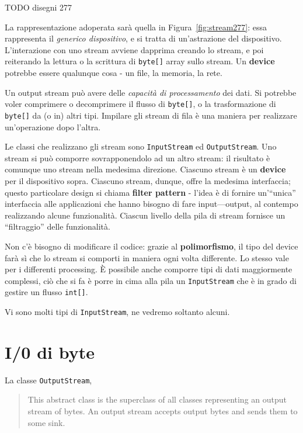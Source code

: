 \documentclass[\fontsizeclass,twocolumn]{\classname}
\theoremstyle{definition}
\theoremstyle{definition}
\begin{document}
TODO disegni 277

La rappresentazione adoperata sarà quella in Figura~\ref{fig:stream277}: essa
rappresenta il \emph{generico dispositivo}, e si tratta di un'astrazione del
dispositivo. L'interazione con uno stream avviene dapprima creando lo stream, e
poi reiterando la lettura o la scrittura di \texttt{byte[]} array sullo stream.
Un \textbf{device} potrebbe essere qualunque cosa \-- un file, la memoria, la
rete. 

Un output stream può avere delle \emph{capacità di processamento} dei dati. Si
potrebbe voler comprimere o decomprimere il flusso di \texttt{byte[]}, o la
trasformazione di \texttt{byte[]} da (o in) altri tipi. Impilare gli stream di
fila è una maniera per realizzare un'operazione dopo l'altra.

Le classi che realizzano gli stream sono \texttt{Input\-Stream} ed
\texttt{Output\-Stream}. Uno stream si può comporre sovrapponendolo ad un altro
stream: il risultato è comunque uno stream nella medesima direzione. Ciascuno
stream è un \textbf{device} per il dispositivo sopra. Ciascuno stream, dunque,
offre la medesima interfaccia; questo particolare design si chiama
\textbf{filter pattern} \-- l'idea è di fornire un'``unica'' interfaccia alle
applicazioni che hanno bisogno di fare input\----output, al contempo
realizzando alcune funzionalità. Ciascun livello della pila di stream fornisce
un ``filtraggio'' delle funzionalità. 

Non c'è bisogno di modificare il codice: grazie al \textbf{polimorfismo}, il
tipo del device farà sì che lo stream si comporti in maniera ogni volta
differente. Lo stesso vale per i differenti processing. È possibile anche
comporre tipi di dati maggiormente complessi, ciò che si fa è porre in cima
alla pila un \texttt{Input\-Stream} che è in grado di gestire un flusso
\texttt{int[]}.

Vi sono molti tipi di \texttt{Input\-Stream}, ne vedremo soltanto alcuni.

\section{I/0 di byte}

La classe \texttt{Output\-Stream},

\begin{quote}
    \footnotesize{This abstract class is the superclass of all classes
    representing an output stream of bytes. An output stream accepts output
bytes and sends them to some sink.}
\end{quote}
\end{document}
